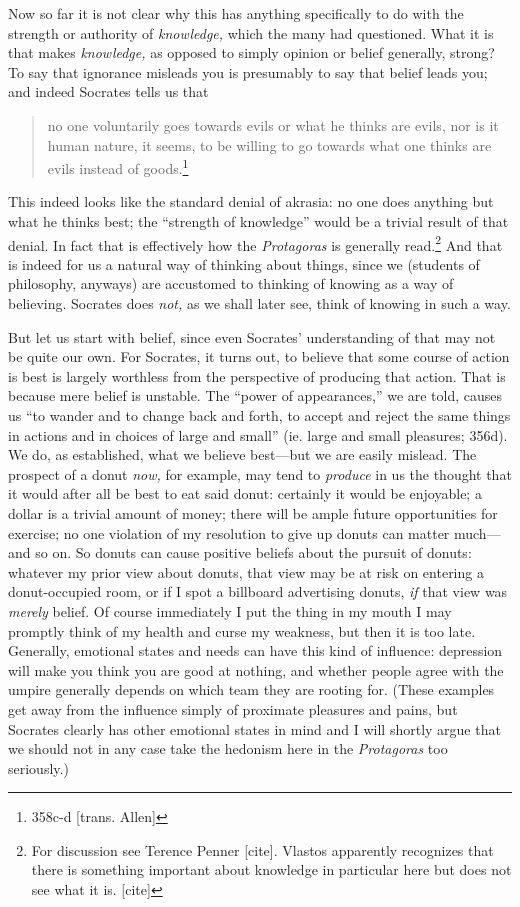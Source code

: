 \documentclass[11pt]{amsart}
\begin{document}
Now so far it is not clear why this has anything specifically to do with the strength or authority of \emph{knowledge,} which the many had questioned. What it is that makes \emph{knowledge,} as opposed to simply opinion or belief generally, strong? To say that ignorance misleads you is presumably to say that belief leads you; and indeed Socrates tells us that \begin{quote}no one voluntarily goes towards evils or what he thinks are evils, nor is it human nature, it seems, to be willing to go towards what one thinks are evils instead of goods.\footnote{358c-d [trans. Allen]}\end{quote} This indeed looks like the standard denial of akrasia: no one does anything but what he thinks best; the ``strength of knowledge'' would be a trivial result of that denial. In fact that is effectively how the \emph{Protagoras} is generally read.\footnote{For discussion see Terence Penner [cite]. Vlastos apparently recognizes that there is something important about knowledge in particular here but does not see what it is. [cite]} And that is indeed for us a natural way of thinking about things, since we (students of philosophy, anyways) are accustomed to thinking of knowing as a way of believing. Socrates does \emph{not,} as we shall later see, think of knowing in such a way.


But let us start with belief, since even Socrates' understanding of that may not be quite our own. For Socrates, it turns out, to believe that some course of action is best is largely worthless from the perspective of producing that action. That is because mere belief is unstable. The ``power of appearances,'' we are told, causes us ``to wander and to change back and forth, to accept and reject the same things in actions and in choices of large and small'' (ie. large and small pleasures; 356d). We do, as established, what we believe best---but we are easily mislead. The prospect of a donut \emph{now,} for example, may tend to \emph{produce} in us the thought that it would after all be best to eat said donut: certainly it would be enjoyable; a dollar is a trivial amount of money; there will be ample future opportunities for exercise; no one violation of my resolution to give up donuts can matter much---and so on. So donuts can cause positive beliefs about the pursuit of donuts: whatever my prior view about donuts, that view may be at risk on entering a donut-occupied room, or if I spot a billboard advertising donuts, \emph{if} that view was \emph{merely} belief. Of course immediately I put the thing in my mouth I may promptly think of my health and curse my weakness, but then it is too late. Generally, emotional states and needs can have this kind of influence: depression will make you think you are good at nothing, and whether people agree with the umpire generally depends on which team they are rooting for. (These examples get away from the influence simply of proximate pleasures and pains, but Socrates clearly has other emotional states in mind and I will shortly argue that we should not in any case take the hedonism here in the \emph{Protagoras} too seriously.)
\end{document}
